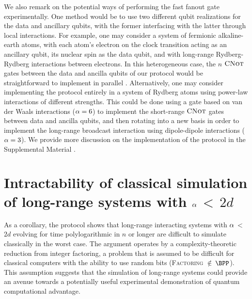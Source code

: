 We also remark on the potential ways of performing the fast fanout gate experimentally.
One method would be to use two different qubit realizations for the data and ancillary qubits,  with the former interfacing with the latter through local interactions.
For example, one may consider a system of fermionic alkaline-earth atoms, with each atom's electron on the clock transition acting as an ancillary qubit, its nuclear spin as the data qubit, and with long-range Rydberg-Rydberg interactions between electrons.
In this heterogeneous case, the $n$ $\textsc{CNot}$ gates between the data and ancilla qubits of our protocol would be straightforward to implement in parallel \cite{Gorshkov2009}.
Alternatively, one may consider implementing the protocol entirely in a system of Rydberg atoms using power-law interactions of different strengths.
This could be done using a gate based on %
van der Waals interactions ($\alpha = 6$) to implement the short-range $\textsc{CNot}$ gates between data and ancilla qubits, and then rotating into a new basis in order to implement the long-range broadcast interaction using dipole-dipole interactions ($\alpha = 3$).
We provide more discussion on the implementation of the protocol in the Supplemental Material \cite{SM}.

\section{Intractability of classical simulation of long-range systems with $\alpha$\,$<$\,$2d$}
As a corollary, the protocol shows that long-range interacting systems with $\alpha$\,$<$\,$2d$ evolving for time polylogarithmic in $n$ or longer are difficult to simulate classically in the worst case.
The argument operates by a complexity-theoretic reduction from integer factoring, a problem that is assumed to be difficult for classical computers with the ability to use random bits (\textsc{Factoring} $\notin$\,$\BPP$).
This assumption suggests that the simulation of long-range systems could provide an avenue towards a potentially useful experimental demonstration of quantum computational advantage.

